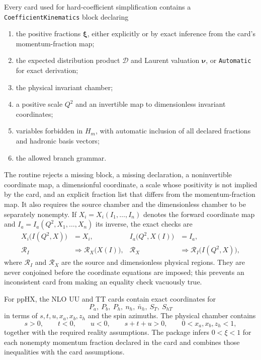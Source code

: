 \documentclass[11pt]{article}
\newcommand{\code}[1]{\texttt{#1}}
\begin{document}
Every card used for hard-coefficient simplification contains a
\code{CoefficientKinematics} block declaring
\begin{enumerate}
  \item the positive fractions $\boldsymbol{\xi}$, either explicitly or by
        exact inference from the card's momentum-fraction map;
  \item the expected distribution product $\mathcal D$ and Laurent valuation
        $\boldsymbol{\nu}$, or \code{Automatic} for exact derivation;
  \item the physical invariant chamber;
  \item a positive scale $Q^2$ and an invertible map to dimensionless
        invariant coordinates;
  \item variables forbidden in $H_m$, with automatic inclusion of all
        declared fractions and hadronic basis vectors;
  \item the allowed branch grammar.
\end{enumerate}
The routine rejects a missing block, a missing declaration, a noninvertible
coordinate map, a dimensionful coordinate, a scale whose positivity is not
implied by the card, and an explicit fraction list that differs from the
momentum-fraction map.  It also requires the source chamber and the
dimensionless chamber to be separately nonempty.  If
\(X_i=X_i(I_1,\ldots,I_n)\) denotes the forward coordinate map and
\(I_a=I_a(Q^2,X_1,\ldots,X_n)\) its inverse, the exact checks are
\begin{align}
 X_i\bigl(I(Q^2,X)\bigr)&=X_i,
 &
 I_a\bigl(Q^2,X(I)\bigr)&=I_a,\\
 \mathcal R_I&\Longrightarrow \mathcal R_X\bigl(X(I)\bigr),
 &
 \mathcal R_X&\Longrightarrow \mathcal R_I\bigl(I(Q^2,X)\bigr),
 \label{eq:chamber-map}
\end{align}
where \(\mathcal R_I\) and \(\mathcal R_X\) are the source and dimensionless
physical regions.  They are never conjoined before the coordinate equations
are imposed; this prevents an inconsistent card from making an equality check
vacuously true.

For ppHX, the NLO UU and TT cards contain exact coordinates for
\begin{equation}
  P_a,\ P_b,\ P_h,\ n_h,\ \bar n_h,\ S_T,\ S_{hT}
\end{equation}
in terms of $s,t,u,x_a,x_b,z_h$ and the spin azimuths.  The physical chamber
contains
\begin{equation}
  s>0,\qquad t<0,\qquad u<0,\qquad s+t+u>0,
  \qquad 0<x_a,x_b,z_h<1,
  \label{eq:physical-chamber}
\end{equation}
together with the required reality assumptions.  The package infers
$0<\xi<1$ for each nonempty momentum fraction declared in the card and
combines those inequalities with the card assumptions.
\end{document}
